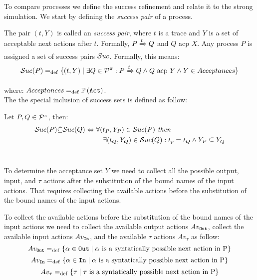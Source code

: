 To compare \picalc{} processes we define the success refinement and relate it to the strong simulation. We start by defining the \textit{success pair} of a process.

The pair $(t, Y)$ is called an \textit{success pair}, where $t$ is a trace and $Y$ is a set of acceptable next actions after $t$. Formally, $P \xRightarrow{t} Q$ and $Q$ acp $X$. Any process
$P$ is assigned a set of success pairs $\Successes[]$. Formally, this means:
\begin{align}
    \Successes[P] \define \{(t,Y) \mid \exists Q\in\procs: P \bigstep{t} Q \wedge Q \text{ acp } Y \wedge Y\in Acceptances\}
\end{align}

where: $Acceptances =_{\mathrm{def}} \mathbb P\left(\mathtt{Act}\right)$.
\\The the special inclusion of success sets is defined as follow:
\begin{definition}
\label{def_success_inclutuion_ref}
Let $P,Q\in\mathcal P^{\pi}$, then:
\begin{equation*}
\begin{aligned}
\Successes[P] \ddot{\subseteq} \Successes[Q] \Leftrightarrow {} & \forall (t_P, Y_P) \in \Successes[P] \textit{ then }\\
      & \ \ \ \exists (t_Q, Y_Q) \in \Successes[Q]: t_p = t_Q \wedge Y_P \subseteq Y_Q
\end{aligned}
\end{equation*}
\ 
\end{definition}
To determine the acceptance set $Y$ we need to collect all the possible output, input, and $\tau$ actions after the substitution of the bound names of the input actions. That requires collecting the available actions before the substitution of the bound names of the input actions.

To collect the available actions before the substitution of the bound names of the input actions we need to collect the available output actions $Av_{\mathtt{Out}}$, collect the available input actions $Av_{\mathtt{In}}$, and the available $\tau$ actions $Av_\tau$ as follow:
\[Av_{\mathtt{Out}}=_{\mathrm{def}}\{ \alpha \in \mathtt{Out} \mid \alpha\text{ is a syntatically possible next action in P}\}\]
\[Av_{\mathtt{In}}=_{\mathrm{def}}\{ \alpha \in \mathtt{In} \mid \alpha\text{ is a syntatically possible next action in P}\}\]
\[Av_\tau=_{\mathrm{def}}\{ \tau \mid \tau\text{ is a syntatically possible next action in P}\}\]

